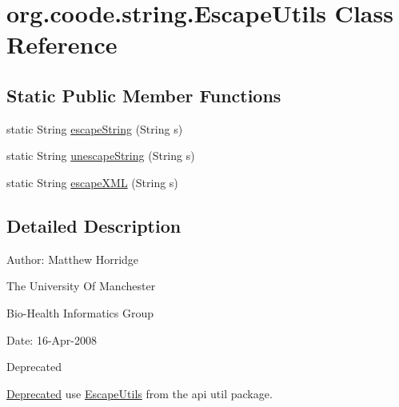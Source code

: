 \hypertarget{classorg_1_1coode_1_1string_1_1_escape_utils}{\section{org.\-coode.\-string.\-Escape\-Utils Class Reference}
\label{classorg_1_1coode_1_1string_1_1_escape_utils}
}
\subsection*{Static Public Member Functions}
\begin{DoxyCompactItemize}
\item 
static String \hyperlink{classorg_1_1coode_1_1string_1_1_escape_utils_a79ae4a47ed14aca45badffb899cea00a}{escape\-String} (String s)
\item 
static String \hyperlink{classorg_1_1coode_1_1string_1_1_escape_utils_a8089863cee676783632957a441a676aa}{unescape\-String} (String s)
\item 
static String \hyperlink{classorg_1_1coode_1_1string_1_1_escape_utils_acffc566dcc652f0075740fc0000e21e6}{escape\-X\-M\-L} (String s)
\end{DoxyCompactItemize}


\subsection{Detailed Description}
Author\-: Matthew Horridge\par
 The University Of Manchester\par
 Bio-\/\-Health Informatics Group\par
 Date\-: 16-\/\-Apr-\/2008\par
 \par


\begin{DoxyRefDesc}{Deprecated}
\item[\hyperlink{deprecated__deprecated000045}{Deprecated}]use \hyperlink{classorg_1_1coode_1_1string_1_1_escape_utils}{Escape\-Utils} from the api util package. \end{DoxyRefDesc}


